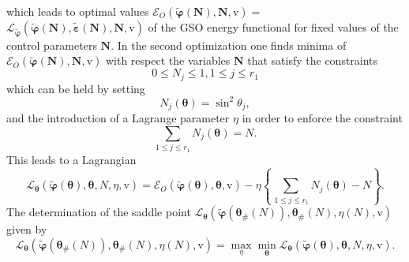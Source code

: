 \documentclass[aps,preprint]{revtex4}%
\begin{document}
which leads to optimal values $\mathcal{E}_{O}\left(
\boldsymbol{\boldsymbol{\tilde{\varphi}}\left(  \boldsymbol{N}\right)
,N,}\mathrm{v}\right)  =$ $\mathcal{L}_{\boldsymbol{\tilde{\varphi}}}\left(
\boldsymbol{\tilde{\varphi}}\left(  \boldsymbol{N}\right)  ,\boldsymbol{\tilde
{\varepsilon}}\left(  \boldsymbol{N}\right)  ,\boldsymbol{N,}\mathrm{v}%
\right)  $ of the GSO energy functional for fixed values of the control
parameters $\boldsymbol{N}$. In the second optimization one finds minima of
$\mathcal{E}_{O}\left(  \boldsymbol{\boldsymbol{\tilde{\varphi}}\left(
\boldsymbol{N}\right)  ,N,}\mathrm{v}\right)  $ with respect the variables
$\boldsymbol{N}$ that satisfy the constraints
\begin{equation}
0\leq N_{j}\leq1,1\leq j\leq r_{1}%
\end{equation}
which can be held by setting
\begin{equation}
N_{j}\left(  \boldsymbol{\theta}\right)  =\sin^{2}\theta_{j},
\end{equation}
and the introduction of a Lagrange parameter $\eta$ in order to enforce the
constraint
\begin{equation}
\sum_{1\leq j\leq r_{1}}N_{j}\left(  \boldsymbol{\theta}\right)  =N.
\end{equation}
This leads to a Lagrangian
\begin{equation}
\mathcal{L}_{\boldsymbol{\theta}}\left(  \boldsymbol{\tilde{\varphi}}\left(
\boldsymbol{\theta}\right)  ,\boldsymbol{\theta},N,\eta,\mathrm{v}\right)
=\mathcal{E}_{O}\left(  \boldsymbol{\tilde{\varphi}}\left(  \boldsymbol{\theta
}\right)  \boldsymbol{,\theta},\mathrm{v}\right)  -\eta\left\{  \sum_{\,1\leq
j\leq r_{1}}N_{j}\left(  \boldsymbol{\theta}\right)  -N\right\}  .
\end{equation}
The determination of the saddle point $\mathcal{L}_{\boldsymbol{\theta}%
}\left(  \boldsymbol{\tilde{\varphi}}\left(  \boldsymbol{\theta}_{\#}\left(
N\right)  \right)  ,\boldsymbol{\theta}_{\#}\left(  N\right)  ,\eta\left(
N\right)  ,\mathrm{v}\right)  $ given by
\begin{equation}
\mathcal{L}_{\boldsymbol{\theta}}\left(  \boldsymbol{\tilde{\varphi}}\left(
\boldsymbol{\theta}_{\#}\left(  N\right)  \right)  ,\boldsymbol{\theta}%
_{\#}\left(  N\right)  ,\eta\left(  N\right)  ,\mathrm{v}\right)  =\max_{\eta
}\min_{\boldsymbol{\theta}}\mathcal{L}_{\boldsymbol{\theta}}\left(
\boldsymbol{\tilde{\varphi}}\left(  \boldsymbol{\theta}\right)
,\boldsymbol{\theta},N,\eta,\mathrm{v}\right)  .
\end{equation}
\end{document}
